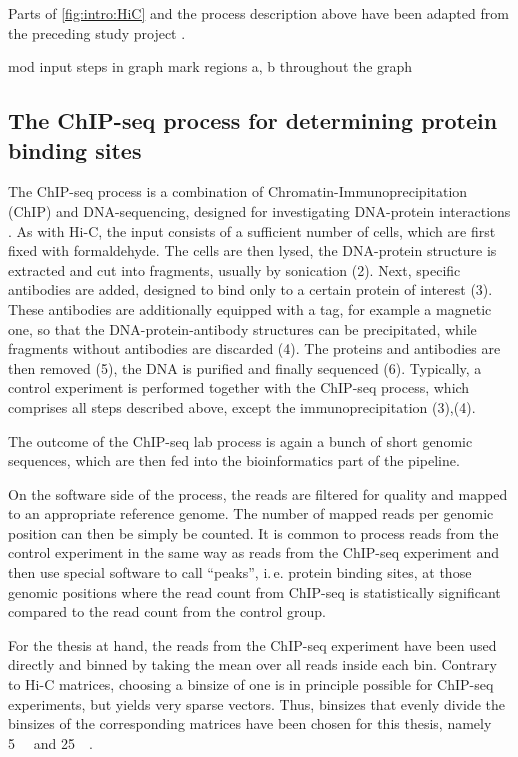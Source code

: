 Parts of \cref{fig:intro:HiC} and the process description above 
have been adapted from the preceding study project \cite{Krauth2020}.



\xxx mod input steps in graph
\xxx mark regions a, b throughout the graph

\subsection{The ChIP-seq process for determining protein binding sites}
The ChIP-seq process is a combination of Chromatin-Immunoprecipitation (ChIP) and DNA-sequencing, 
designed for investigating DNA-protein interactions \cite{Johnson2007,Robertson2007}.
As with Hi-C, the input consists of a sufficient number of cells, which are first fixed with formaldehyde.
The cells are then lysed, the DNA-protein structure is extracted and cut into fragments, 
usually by sonication (2).
Next, specific antibodies are added, designed to bind only to a certain protein of interest (3).
These antibodies are additionally equipped with a tag, for example a magnetic one, so that 
the DNA-protein-antibody structures can be precipitated, while fragments without antibodies are discarded (4).
The proteins and antibodies are then removed (5), 
the DNA is purified and finally sequenced (6).
Typically, a control experiment is performed together with the ChIP-seq process, 
which comprises all steps described above, except the immunoprecipitation (3),(4).

The outcome of the ChIP-seq lab process is again a bunch of short genomic sequences, 
which are then fed into the bioinformatics part of the pipeline.

On the software side of the process, the reads are filtered for quality and mapped to an appropriate reference genome.
The number of mapped reads per genomic position can then be simply be counted.
It is common to process reads from the control experiment in the same way as reads from the ChIP-seq experiment
and then use special software to call ``peaks'', i.\,e. protein binding sites,
at those genomic positions where the read count from ChIP-seq
is statistically significant compared to the read count from the control group.

For the thesis at hand, the reads from the ChIP-seq experiment have been used directly
and binned by taking the mean over all reads inside each bin.
Contrary to Hi-C matrices, choosing a binsize of one is in principle possible for ChIP-seq experiments, but yields very sparse vectors.
Thus, binsizes that evenly divide the binsizes of the corresponding matrices have been chosen for this thesis, namely \SI{5}{\kilo\bp} and \SI{25}{\kilo\bp}.

